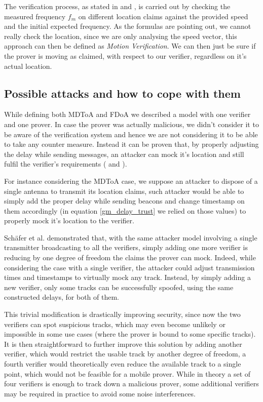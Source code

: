 \documentclass[conference]{IEEEtran}
\begin{document}
The verification process, as stated in \cite{schaefer16} and \cite{ghose15}, is carried out by checking the measured frequency \(f_m\) on different location claims against the provided speed and the initial expected frequency. As the formulas are pointing out, we cannot really check the location, since we are only analysing the speed vector, this approach can then be defined as \textit{Motion Verification}. We can then just be sure if the prover is moving as claimed, with respect to our verifier, regardless on it's actual location.

\subsection{Possible attacks and how to cope with them}

While defining both MDToA and FDoA we described a model with one verifier and one prover. In case the prover was actually malicious, we didn't consider it to be aware of the verification system and hence we are not considering it to be able to take any counter measure. Instead it can be proven that, by properly adjusting the delay while sending messages, an attacker can mock it's location and still fulfil the verifier's requirements (\cite{schaefer15} and \cite{schaefer16}).

For instance considering the MDToA case, we suppose an attacker to dispose of a single antenna to transmit its location claims, such attacker would be able to simply add the proper delay while sending beacons and change timestamp on them accordingly (in equation \eqref{gm_delay_trust} we relied on those values) to properly mock it's location to the verifier.

Schäfer et al. \cite{schaefer15} demonstrated that, with the same attacker model involving a single transmitter broadcasting to all the verifiers, simply adding one more verifier is reducing by one degree of freedom the claims the prover can mock. Indeed, while considering the case with a single verifier, the attacker could adjust transmission times and timestamps to virtually mock any track. Instead, by simply adding a new verifier, only some tracks can be successfully spoofed, using the same constructed delays, for both of them.

This trivial modification is drastically improving security, since now the two verifiers can spot suspicious tracks, which may even become unlikely or impossible in some use cases (where the prover is bound to some specific tracks). It is then straightforward to further improve this solution by adding another verifier, which would restrict the usable track by another degree of freedom, a fourth verifier would theoretically even reduce the available track to a single point, which would not be feasible for a mobile prover.
While in theory a set of four verifiers is enough to track down a malicious prover, some additional verifiers may be required in practice to avoid some noise interferences.
\end{document}
